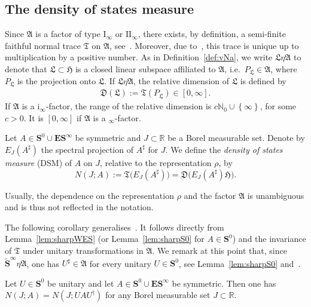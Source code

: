 \documentclass[AHL,Unicode,longabstracts,published]{cedram}
\newcommand{\rmI}{\mathrm{I}}
\newcommand{\rmi}{\mathrm{i}}
\newcommand{\rmII}{\mathrm{II}}
\newcommand{\R}{\mathbb R}
\newcommand{\N}{\mathbb N}
\newcommand{\BE}{\mathbf E}
\newcommand{\BS}{\mathbf S}
\newcommand{\FA}{\mathfrak A}
\newcommand{\FD}{\mathfrak D}
\newcommand{\FH}{\mathfrak H}
\newcommand{\FL}{\mathfrak L}
\newcommand{\FT}{\mathfrak T}
\renewcommand{\subseteq}{\subset}
\newcommand{\set}[1]{\left\{ #1 \right\}}
\begin{document}
\subsection{The density of states measure}\label{sec:dsm}

Since $\FA$ is a factor of type $\rmI_\infty$ or $\rmII_\infty$, there exists, by definition, a semi-finite faithful normal trace $\FT$ on $\FA$, see~\cite[I.6 and I.8.4]{Dixmier}. Moreover, due to~\cite[I.6.4, Corollary]{Dixmier}, this trace is unique up to multiplication by a positive number. As in Definition~\ref{def:vNa}, we write $\FL\eta\FA$ to denote that $\FL\subset \FH$ is a closed linear subspace affiliated to $\FA$, i.e.~$P_{\FL}\in\FA$, where $P_\FL$ is the projection onto $\FL$. If $\FL\eta \FA$, the relative dimension of $\FL$ is defined by
\begin{align*}
\FD(\FL):=\FT(P_{\FL})\in [0,\infty].
\end{align*}
If $\FA$ is a $\rmi_\infty$-factor, the range of the relative dimension is $c\N_0\cup\set{\infty}$, for some $c>0$. It is $[0,\infty]$ if $\FA$ is a $_\infty$-factor.

\begin{defi}
Let $A\in\BS^0\cup\BE\BS^\infty$ be symmetric and $J\subseteq \R$ be a Borel measurable set. Denote by $E_J(A^\sharp)$ the spectral projection of $A^\sharp$ for $J$. We define the \emph{density of states measure} (DSM) of $A$ on $J$, relative to the representation $\rho$, by
\begin{equation}
N(J; A) := \FT\big(E_J(A^\sharp)\big)=\FD\big(E_J(A^\sharp)\FH\big).\label{eq:dfnids}
\end{equation}
\end{defi}


\begin{rema}\label{rem:iiinfinityfactor}
Usually, the dependence on the representation $\rho$ and the factor $\FA$ is unambiguous and is thus not reflected in the notation.
\end{rema}
The following corollary generalises~\cite[Lemma~4.4]{ParSht2012}. It follows directly from Lemma~\ref{lem:sharpWES} (or Lemma~\ref{lem:sharpS0} for $A\in\BS^0$) and the invariance of $\FT$ under unitary transformations in $\FA$. We remark at this point that, since $\widetilde{\BS}^\infty\eta\FA$, one has $U^\sharp\in\FA$ for every unitary $U\in\BS^0$, see Lemma~\ref{lem:sharpS0} and~\cite[\S 35.1]{Naimark}.
\begin{coro} \label{cor:unitary}
Let $U\in\BS^0$ be unitary and let $A\in\BS^0\cup\BE\BS^\infty$ be symmetric. Then one has $N(J;A) = N(J;U A U^\dagger)$ for any Borel measurable set $J\subseteq \R$.
\end{coro}
\end{document}
